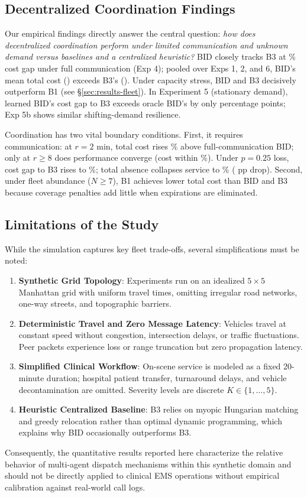\documentclass{article}
\begin{document}
\subsection{Decentralized Coordination Findings}
Our empirical findings directly answer the central question: \textit{how does decentralized coordination perform under limited communication and unknown demand versus baselines and a centralized heuristic?}
BID closely tracks B3 at \FullBIDCostGapPercent\% cost gap under full communication (Exp 4); pooled over Exps 1, 2, and 6, BID's mean total cost (\PooledBIDTotalCost) exceeds B3's (\PooledBThreeTotalCost). Under capacity stress, BID and B3 decisively outperform B1 (see \S\ref{sec:results-fleet}). In Experiment 5 (stationary demand), learned BID's cost gap to B3 exceeds oracle BID's by only \LearnedOracleGapDiffPP{} percentage points; Exp 5b shows similar shifting-demand resilience.

Coordination has two vital boundary conditions. First, it requires communication: at $r=2$ min, total cost rises \RadiusTwoCostIncPercent\% above full-communication BID; only at $r \ge 8$ does performance converge (cost within \RadiusEightCostIncPercent\%). Under $p=0.25$ loss, cost gap to B3 rises to \LossyBIDCostGapPercent\%; total absence collapses service to \NoneBIDServicePercent\% (\FullNoneServiceDifferencePP{} pp drop). Second, under fleet abundance ($N \ge 7$), B1 achieves lower total cost than BID and B3 because coverage penalties add little when expirations are eliminated.

\subsection{Limitations of the Study}
While the simulation captures key fleet trade-offs, several simplifications must be noted:
\begin{enumerate}\itemsep0pt\parskip0pt
\item \textbf{Synthetic Grid Topology}: Experiments run on an idealized $5\times 5$ Manhattan grid with uniform travel times, omitting irregular road networks, one-way streets, and topographic barriers.
\item \textbf{Deterministic Travel and Zero Message Latency}: Vehicles travel at constant speed without congestion, intersection delays, or traffic fluctuations. Peer packets experience loss or range truncation but zero propagation latency.
\item \textbf{Simplified Clinical Workflow}: On-scene service is modeled as a fixed 20-minute duration; hospital patient transfer, turnaround delays, and vehicle decontamination are omitted. Severity levels are discrete $K \in \{1, \ldots, 5\}$.
\item \textbf{Heuristic Centralized Baseline}: B3 relies on myopic Hungarian matching and greedy relocation rather than optimal dynamic programming, which explains why BID occasionally outperforms B3.
\end{enumerate}
Consequently, the quantitative results reported here characterize the relative behavior of multi-agent dispatch mechanisms within this synthetic domain and should not be directly applied to clinical EMS operations without empirical calibration against real-world call logs.
\end{document}
